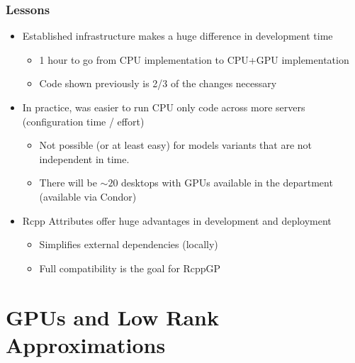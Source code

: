 \documentclass[t]{beamer}\usepackage[]{graphicx}\usepackage[]{color}
\begin{document}
\begin{frame}[label=pm_lessons]
\frametitle{Lessons}


\begin{itemize}
\item Established infrastructure makes a huge difference in development time
\begin{itemize}
  \vspace{2mm} \item 1 hour to go from CPU implementation to CPU+GPU implementation 
  \vspace{2mm} \item Code shown previously is 2/3 of the changes necessary \hyperlink{code}{}
\end{itemize}

\vspace{2mm}
\item In practice, was easier to run CPU only code across more servers (configuration time / effort)

\begin{itemize}
\vspace{2mm} \item Not possible (or at least easy) for models variants that are not independent in time.
\vspace{2mm} \item There will be $\sim20$ desktops with GPUs available in the department (available via Condor)
\end{itemize}

\vspace{2mm}

\item Rcpp Attributes offer huge advantages in development and deployment
\begin{itemize}
\vspace{2mm} \item Simplifies external dependencies (locally)
\vspace{2mm} \item Full compatibility is the goal for RcppGP
\end{itemize}

\end{itemize}

\end{frame}


\section{GPUs and Low Rank Approximations}
\end{document}
